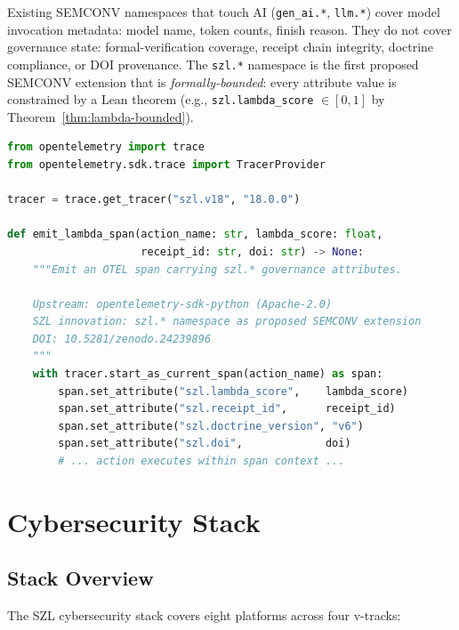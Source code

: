 Existing SEMCONV namespaces that touch AI (\texttt{gen\_ai.*}, \texttt{llm.*})
cover model invocation metadata: model name, token counts, finish reason.
They do not cover governance state: formal-verification coverage, receipt
chain integrity, doctrine compliance, or DOI provenance.  The \texttt{szl.*}
namespace is the first proposed SEMCONV extension that is
\emph{formally-bounded}: every attribute value is constrained by a Lean
theorem (e.g., \texttt{szl.lambda\_score} $\in [0,1]$ by
Theorem~\ref{thm:lambda-bounded}).

\begin{lstlisting}[language=Python, caption={Emitting a \texttt{szl.*}
  OTEL span in Python}, label={lst:otel-span}]
from opentelemetry import trace
from opentelemetry.sdk.trace import TracerProvider

tracer = trace.get_tracer("szl.v18", "18.0.0")

def emit_lambda_span(action_name: str, lambda_score: float,
                     receipt_id: str, doi: str) -> None:
    """Emit an OTEL span carrying szl.* governance attributes.
    
    Upstream: opentelemetry-sdk-python (Apache-2.0)
    SZL innovation: szl.* namespace as proposed SEMCONV extension
    DOI: 10.5281/zenodo.24239896
    """
    with tracer.start_as_current_span(action_name) as span:
        span.set_attribute("szl.lambda_score",    lambda_score)
        span.set_attribute("szl.receipt_id",      receipt_id)
        span.set_attribute("szl.doctrine_version", "v6")
        span.set_attribute("szl.doi",             doi)
        # ... action executes within span context ...
\end{lstlisting}

\section{Cybersecurity Stack}
\label{sec:cybersecurity}

\subsection{Stack Overview}
\label{ssec:cyber-overview}

The SZL cybersecurity stack covers eight platforms across four v-tracks:

